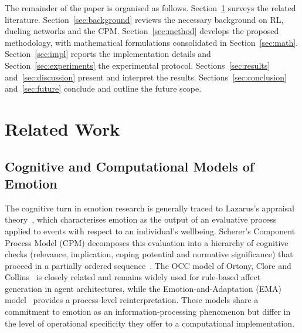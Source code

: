 \documentclass[conference]{IEEEtran}
\begin{document}
The remainder of the paper is organised as follows.
Section~\ref{sec:related} surveys the related literature.
Section~\ref{sec:background} reviews the necessary background on RL, dueling
networks and the CPM. Section~\ref{sec:method} develops the proposed
methodology, with mathematical formulations consolidated in
Section~\ref{sec:math}. Section~\ref{sec:impl} reports the implementation
details and Section~\ref{sec:experiments} the experimental protocol.
Sections~\ref{sec:results} and~\ref{sec:discussion} present and interpret the
results. Sections~\ref{sec:conclusion} and~\ref{sec:future} conclude and
outline the future scope.

\section{Related Work}
\label{sec:related}

\subsection{Cognitive and Computational Models of Emotion}
The cognitive turn in emotion research is generally traced to Lazarus's
appraisal theory~\cite{lazarus1991emotion}, which characterises emotion as the
output of an evaluative process applied to events with respect to an
individual's wellbeing. Scherer's Component Process Model (CPM) decomposes this
evaluation into a hierarchy of cognitive checks (relevance, implication,
coping potential and normative significance) that proceed in a partially
ordered sequence~\cite{scherer2001appraisal}. The OCC model of Ortony, Clore
and Collins~\cite{ortony1990cognitive} is closely related and remains widely
used for rule-based affect generation in agent architectures, while the
Emotion-and-Adaptation (EMA) model~\cite{marsella2009ema} provides a
process-level reinterpretation. These models share a commitment to emotion as
an information-processing phenomenon but differ in the level of operational
specificity they offer to a computational implementation.
\end{document}

